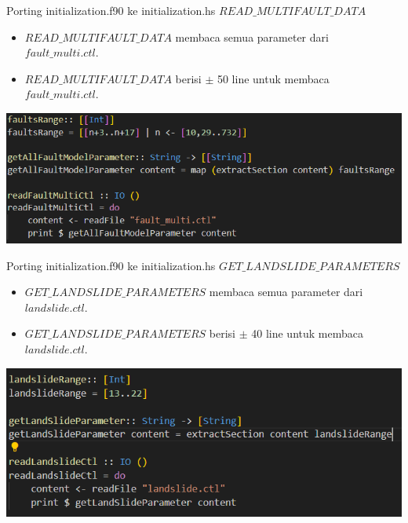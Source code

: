 \documentclass{beamer}
\begin{document}
\begin{frame}{Porting initialization.f90 ke initialization.hs}
    $READ\_MULTIFAULT\_DATA$
    \begin{itemize}
        \item $READ\_MULTIFAULT\_DATA$ membaca semua parameter dari $fault\_multi.ctl$.
        \item $READ\_MULTIFAULT\_DATA$ berisi $\pm$ 50 line untuk membaca $fault\_multi.ctl$.
    \end{itemize}
    \includegraphics[scale=0.5]{figure/read_fault_multi.png}
        
\end{frame}

\begin{frame}{Porting initialization.f90 ke initialization.hs}
    $GET\_LANDSLIDE\_PARAMETERS$
    \begin{itemize}
        \item $GET\_LANDSLIDE\_PARAMETERS$ membaca semua parameter dari $landslide.ctl$.
        \item $GET\_LANDSLIDE\_PARAMETERS$ berisi $\pm$ 40 line untuk membaca $landslide.ctl$.
    \end{itemize}
    \includegraphics[scale=0.5]{figure/read_landslide.png}
\end{frame}
\end{document}
